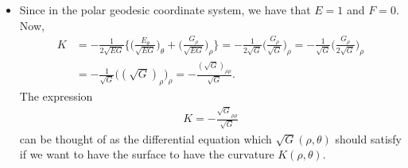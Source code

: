 \documentclass[10pt]{article}
\begin{document}
\begin{itemize}
    \item Since in the polar geodesic coordinate system, we have that $E = 1$ and $F = 0$. Now,
    \begin{align*}
      K 
      &= -\frac{1}{2\sqrt{EG}} \bigg\{ \bigg( \frac{E_\theta}{\sqrt{EG}}\bigg)_\theta  + \bigg( \frac{G_\rho}{\sqrt{EG}} \bigg)_\rho \bigg\}
      = -\frac{1}{2\sqrt{G}} \bigg( \frac{G_\rho}{\sqrt{G}} \bigg)_\rho
      = -\frac{1}{\sqrt{G}} \bigg( \frac{G_\rho}{2\sqrt{G}}\bigg)_\rho\\
      &= -\frac{1}{\sqrt{G}} \big( (\sqrt{G})_\rho \big)_\rho
      = -\frac{(\sqrt{G})_{\rho\rho}}{\sqrt{G}}.
    \end{align*}
    The expression
    \begin{align*}
      K = -\frac{\sqrt{G}_{\rho\rho}}{\sqrt{G}}
    \end{align*}
    can be thought of as the differential equation which $\sqrt{G}(\rho,\theta)$ should satisfy if we want to have the surface to have the curvature $K(\rho,\theta).$
  \end{itemize}
\end{document}
